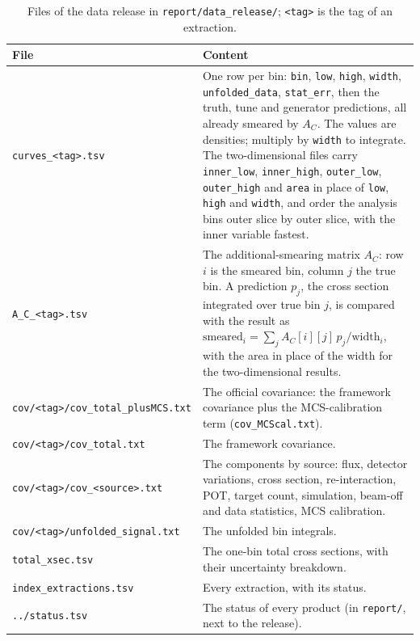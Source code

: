\documentclass[11pt,a4paper]{article}
\begin{document}
\begin{table}[H]
  \centering
  \caption{Files of the data release in \texttt{report/data\_release/}; \texttt{<tag>} is the tag of an
    extraction.}
  \label{tab:release_schema}
  \footnotesize
  \begin{tabular}{@{}L{5.3cm}L{10.2cm}@{}}
    \toprule
    File & Content \\
    \midrule
    \texttt{curves\_<tag>.tsv} & One row per bin: \texttt{bin}, \texttt{low}, \texttt{high},
      \texttt{width}, \texttt{unfolded\_data}, \texttt{stat\_err}, then the truth, tune and generator
      predictions, all already smeared by $A_C$. The values are densities; multiply by \texttt{width}
      to integrate. The two-dimensional files carry \texttt{inner\_low}, \texttt{inner\_high},
      \texttt{outer\_low}, \texttt{outer\_high} and \texttt{area} in place of \texttt{low},
      \texttt{high} and \texttt{width}, and order the analysis bins outer slice by outer slice, with
      the inner variable fastest. \\
    \texttt{A\_C\_<tag>.tsv} & The additional-smearing matrix $A_C$: row $i$ is the smeared bin, column
      $j$ the true bin. A prediction $p_j$, the cross section integrated over true bin $j$, is
      compared with the result as $\mathrm{smeared}_i=\sum_j A_C[i][j]\,p_j/\mathrm{width}_i$, with
      the area in place of the width for the two-dimensional results. \\
    \texttt{cov/<tag>/cov\_total\_plusMCS.txt} & The official covariance: the framework covariance plus
      the MCS-calibration term (\texttt{cov\_MCScal.txt}). \\
    \texttt{cov/<tag>/cov\_total.txt} & The framework covariance. \\
    \texttt{cov/<tag>/cov\_<source>.txt} & The components by source: flux, detector variations, cross
      section, re-interaction, POT, target count, simulation, beam-off and data statistics, MCS
      calibration. \\
    \texttt{cov/<tag>/unfolded\_signal.txt} & The unfolded bin integrals. \\
    \texttt{total\_xsec.tsv} & The one-bin total cross sections, with their uncertainty breakdown. \\
    \texttt{index\_extractions.tsv} & Every extraction, with its status. \\
    \texttt{../status.tsv} & The status of every product (in \texttt{report/}, next to the release). \\
    \bottomrule
  \end{tabular}
\end{table}
\end{document}

